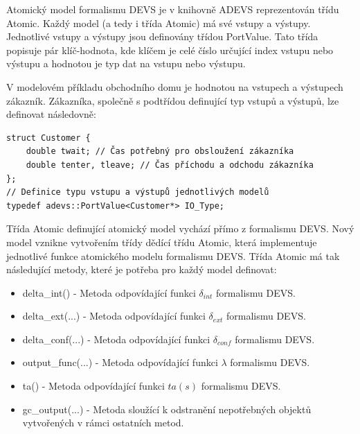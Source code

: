 Atomický model formalismu DEVS je v knihovně ADEVS reprezentován třídu Atomic. Každý model (a tedy i třída Atomic) má své vstupy a výstupy. Jednotlivé vstupy a výstupy jsou definovány třídou PortValue. Tato třída popisuje pár klíč-hodnota, kde klíčem je celé číslo určující index vstupu nebo výstupu a hodnotou je typ dat na vstupu nebo výstupu.

V modelovém příkladu obchodního domu je hodnotou na vstupech a výstupech zákazník. Zákazníka, společně s podtřídou definující typ vstupů a výstupů, lze definovat následovně:

\begin{lstlisting}
struct Customer {
    double twait; // Čas potřebný pro obsloužení zákazníka
    double tenter, tleave; // Čas příchodu a odchodu zákazníka
};
// Definice typu vstupu a výstupů jednotlivých modelů
typedef adevs::PortValue<Customer*> IO_Type;
\end{lstlisting}

Třída Atomic definující atomický model vychází přímo z formalismu DEVS. Nový model vznikne vytvořením třídy dědící třídu Atomic, která implementuje jednotlivé funkce atomického modelu formalismu DEVS. Třída Atomic má tak následující metody, které je potřeba pro každý model definovat:

\begin{itemize}
\item delta\_int() - Metoda odpovídající funkci $\delta_{int}$ formalismu DEVS.
\item delta\_ext(...) - Metoda odpovídající funkci $\delta_{ext}$ formalismu DEVS.
\item delta\_conf(...) - Metoda odpovídající funkci $\delta_{conf}$ formalismu DEVS.
\item output\_func(...) - Metoda odpovídající funkci $\lambda$ formalismu DEVS.
\item ta() - Metoda odpovídající funkci $ta(s)$ formalismu DEVS.
\item gc\_output(...) - Metoda sloužící k odstranění nepotřebných objektů vytvořených v rámci ostatních metod.
\end{itemize}

